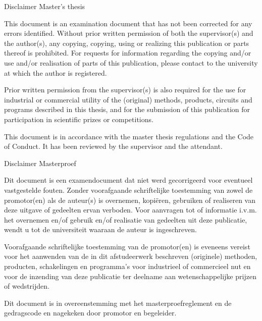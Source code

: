 \begin{flushleft}
\small
{} {
Disclaimer Master's thesis

This document is an examination document that has not been corrected for any errors identified.
Without prior written permission of both the supervisor(s) and the author(s), any copying, copying, using or realizing this publication or parts thereof is prohibited.
For requests for information regarding the copying and/or use and/or realisation of parts of this publication, please contact to the university at which the author is registered.

Prior written permission from the supervisor(s) is also required for the use for industrial or commercial utility of the (original) methods, products, circuits and programs described in this thesis,  and for the submission of this publication for participation in scientific prizes or competitions.

This document is in accordance with the master thesis regulations and the Code of Conduct.
It has been reviewed by the supervisor and the attendant.
}{
Disclaimer Masterproef

Dit document is een examendocument dat niet werd gecorrigeerd voor eventueel vastgestelde fouten.
Zonder voorafgaande schriftelijke toestemming van zowel de promotor(en) als de auteur(s) is overnemen, kopi\"{e}ren, gebruiken of realiseren van deze uitgave of gedeelten ervan verboden.
Voor aanvragen tot of informatie i.v.m. het overnemen en/of gebruik en/of realisatie van gedeelten uit deze publicatie, wendt u tot de universiteit waaraan de auteur is ingeschreven.


Voorafgaande schriftelijke toestemming van de promotor(en) is eveneens vereist voor het aanwenden van de in dit afstudeerwerk beschreven (originele) methoden, producten, schakelingen en programma's voor industrieel of commercieel nut en voor de inzending van deze publicatie ter deelname aan wetenschappelijke prijzen of wedstrijden.

Dit document is in overeenstemming met het masterproefreglement en de gedragscode en nagekeken door promotor en begeleider.
}
 \end{flushleft}

